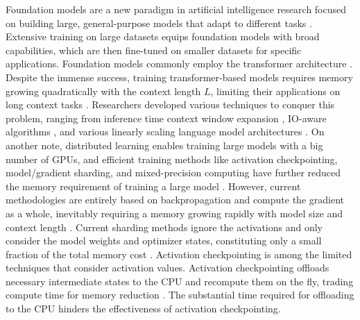\documentclass{article}
\begin{document}
Foundation models are a new paradigm in artificial intelligence research focused on building large, general-purpose models that adapt to different tasks \cite{openai2024gpt4technicalreport2, dubey2024llama3herdmodels2, cai2024internlm2technicalreport2, pióro2024moemambaefficientselectivestate}. Extensive training on large datasets equips foundation models with broad capabilities, which are then fine-tuned on smaller datasets for specific applications. 
Foundation models commonly employ the transformer architecture \cite{vaswani2023attentionneed}. Despite the immense success, training transformer-based models requires memory growing quadratically with the context length $L$, limiting their applications on long context tasks \cite{li2024longcontextllmsstrugglelong}.
Researchers developed various techniques to conquer this problem, ranging from inference time context window expansion \citep{ding2024longropeextendingllmcontext, ding2024longrope}, IO-aware algorithms \citep{dao2022flashattentionfastmemoryefficientexact, dao2023flashattention2fasterattentionbetter, shah2024flashattention3fastaccurateattention}, and various linearly scaling language model architectures \citep{gu2024mambalineartimesequencemodeling, dao2024transformersssmsgeneralizedmodels, peng2023rwkvreinventingrnnstransformer, beltagy2020longformerlongdocumenttransformer}.
On another note, distributed learning enables training large models with a big number of GPUs, and efficient training methods like activation checkpointing, model/gradient sharding, and mixed-precision computing have further reduced the memory requirement of training a large model \cite{Verbraeken_2020, zhao2023pytorchfsdpexperiencesscaling, rajbhandari2020zeromemoryoptimizationstraining, micikevicius2018mixedprecisiontraining, herrmann2019optimalcheckpointingheterogeneouschains}.
However, current methodologies are entirely based on backpropagation and compute the gradient as a whole, inevitably requiring a memory growing rapidly with model size and context length \citep{damadi2023backpropagationalgorithmmathstudent}. Current sharding methods ignore the activations and only consider the model weights and optimizer states, constituting only a small fraction of the total memory cost \citep{sohoni2022lowmemoryneuralnetworktraining}. Activation checkpointing is among the limited techniques that consider activation values. Activation checkpointing offloads necessary intermediate states to the CPU and recompute them on the fly, trading compute time for memory reduction \citep{sohoni2022lowmemoryneuralnetworktraining, rajbhandari2020zero}. The substantial time required for offloading to the CPU hinders the effectiveness of activation checkpointing. 
\end{document}
